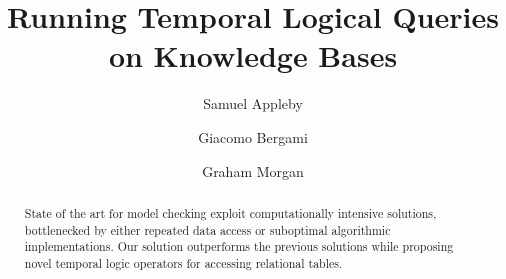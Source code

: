 \documentclass[sigconf]{acmart}
\begin{document}
	\title{Running Temporal Logical Queries on Knowledge Bases}

\author{Samuel Appleby}


\author{Giacomo Bergami}


\author{Graham Morgan}

	\renewcommand{\shortauthors}{Appleby et al.}

\begin{abstract}
State of the art for model checking exploit computationally intensive solutions, bottlenecked by either repeated data access or suboptimal algorithmic implementations. Our solution outperforms the previous solutions while proposing novel temporal logic operators for accessing relational tables.	
\end{abstract}
\end{document}
